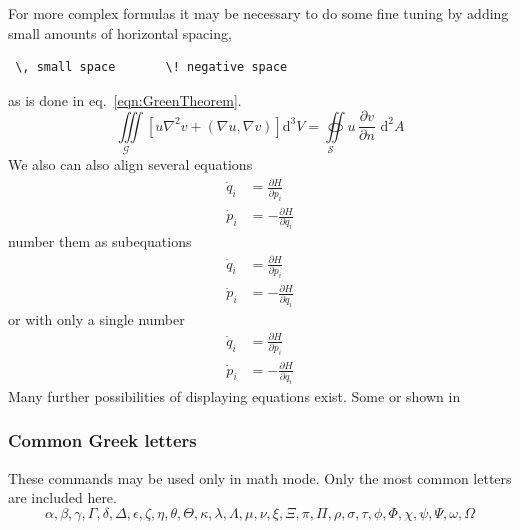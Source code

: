 For more complex formulas it may be necessary to do some fine tuning by adding small amounts of horizontal spacing, 
\begin{verbatim}
 \, small space       \! negative space
\end{verbatim}
as is done in eq.~\eqref{eqn:GreenTheorem}.
\begin{equation}
  \underset{\mathcal{G}\quad}\iiint\!
  \left[u\nabla^{2}v+\left(\nabla  u,\nabla  v\right)\right]\mathrm{d}^{3}V
  =\underset{\mathcal{S}\quad}\oiint  u\,\frac{\partial v}{\partial n}
  \,\,\mathrm{d}^{2}A
  \label{eqn:GreenTheorem}
\end{equation}
We also can also align several equations
\begin{align}
  \dot{q}_i & = \frac{\partial H}{\partial p_i} \\
  \dot{p}_i & = -\frac{\partial H}{\partial q_i} 
\end{align}
number them as subequations
\begin{subequations}
\begin{align}
  \dot{q}_i & = \frac{\partial H}{\partial p_i} \\
  \dot{p}_i & = -\frac{\partial H}{\partial q_i} 
\end{align}
\end{subequations}
or with only a single number
\begin{equation}
\begin{aligned}
  \dot{q}_i & = \frac{\partial H}{\partial p_i} \\
  \dot{p}_i & = -\frac{\partial H}{\partial q_i} 
\end{aligned}
\end{equation}
Many further possibilities of displaying equations exist. Some or shown in 

\subsubsection{Common Greek letters}
\label{sec:example:math:greekletters}
These commands may be used only in math mode. Only the most common
letters are included here.
%
\[\alpha, \beta, \gamma, \Gamma, \delta,\Delta,
\epsilon, \zeta, \eta, \theta, \Theta, \kappa,
\lambda, \Lambda, \mu, \nu, \xi, \Xi, \pi, \Pi,
\rho, \sigma, \tau, \phi, \Phi, \chi, \psi, \Psi,
\omega, \Omega\]

